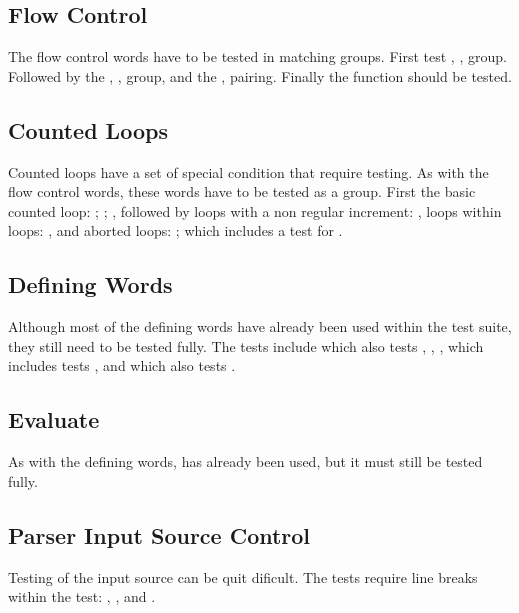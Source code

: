 \subsection{Flow Control}

The flow control words have to be tested in matching groups.
First test , ,  group.
Followed by the , ,
 group, and the , 
pairing.  Finally the  function should
be tested.

\subsection{Counted Loops}

Counted loops have a set of special condition that require testing.
As with the flow control words, these words have to be tested as
a group.
First the basic counted loop: ; ;
	,
followed by loops with a non regular increment:
	,
loops within loops:
	,
and aborted loops:
	;
	 which includes a test for .

\subsection{Defining Words}

Although most of the defining words have already been used within the
test suite, they still need to be tested fully.  The tests include
	 which also tests \word{;},
	,
	,
	 which includes tests , and
	 which also tests .

\subsection{Evaluate}

As with the defining words,  has
already been used, but it must still be tested fully.

\subsection{Parser Input Source Control}

Testing of the input source can be quit dificult.  The tests
require line breaks within the test:
	,
	, and
	.

